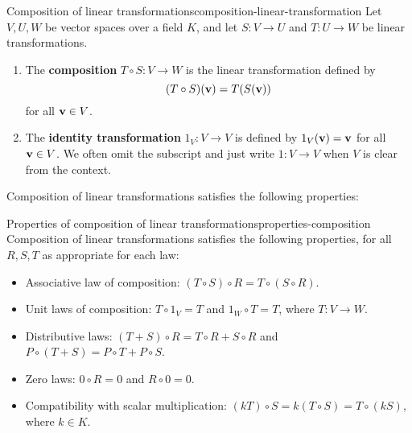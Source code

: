 \begin{definition}{Composition of linear transformations}{composition-linear-transformation}
  Let $V,U,W$ be vector spaces over a field $K$, and let $S:V\to U$
  and $T:U\to W$ be linear transformations.
  \begin{enumialphparenastyle}
    \begin{enumerate}
    \item The
      \textbf{composition}%
       $T\circ S:V\to W$ is
      the linear transformation defined by
      \begin{equation*}
        (T\circ S) (\mbox{\bf v}) = T(S(\mbox{\bf v}))
      \end{equation*}
      for all $\mbox{\bf v}\in V$.
    \item The \textbf{identity transformation}%
      $1_V:V\to V$ is defined by $1_V(\mbox{\bf v})=\mbox{\bf v}$ for all
      $\mbox{\bf v}\in V$. We often omit the subscript and just write
      $1:V\to V$ when $V$ is clear from the context.
    \end{enumerate}
  \end{enumialphparenastyle}
\end{definition}

Composition of linear transformations satisfies the following properties:

\begin{proposition}{Properties of composition of linear transformations}{properties-composition}
  Composition of linear transformations satisfies the following
  properties, for all $R,S,T$ as appropriate for each law:%
  \begin{itemize}\setlength\itemsep{0em}
  \item Associative law of composition: 
    $(T\circ S)\circ R = T\circ (S\circ R)$.
  \item Unit laws of composition: $T\circ 1_V = T$ and $1_W\circ T = T$, where
    $T:V\to W$.
  \item Distributive laws: $(T+S)\circ R = T\circ R + S\circ R$ and
    $P\circ (T+S) = P\circ T + P\circ S$.
  \item Zero laws: $0\circ R = 0$ and $R\circ 0 = 0$.
  \item Compatibility with scalar multiplication:
    $(kT)\circ S = k(T\circ S) = T\circ (kS)$, where $k\in K$.
  \end{itemize}
\end{proposition}

